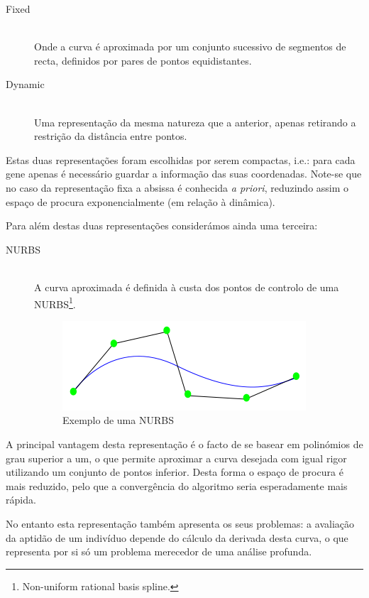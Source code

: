 \documentclass[a4paper]{article}
\begin{document}
\begin{description}
	\item[Fixed] \hfill \\ 
		Onde a curva é aproximada por um conjunto sucessivo de segmentos de recta, definidos por pares de pontos equidistantes.
	\item[Dynamic] \hfill \\ 
		Uma representação da mesma natureza que a anterior, apenas retirando a restrição da distância entre pontos.
\end{description}

\indent Estas duas representações foram escolhidas por serem compactas, i.e.: para cada gene apenas é necessário guardar a informação das suas coordenadas.
Note-se que no caso da representação fixa a absissa é conhecida \emph{a priori}, reduzindo assim o espaço de procura exponencialmente (em relação à dinâmica).

\indent Para além destas duas representações considerámos ainda uma terceira:

\begin{description}
	\item[NURBS] \hfill \\ 
		A curva aproximada é definida à custa dos pontos de controlo de uma NURBS\footnote[2]{Non-uniform rational basis spline.}. 
		\begin{figure}[ht]
			\centering
			\includegraphics[scale=0.50]{images/NURBstatic.png}
			\caption{Exemplo de uma NURBS}
			\label{fig:nurbs}
		\end{figure}
\end{description}

\indent A principal vantagem desta representação é o facto de se basear em polinómios de grau superior a um, o que permite aproximar a curva desejada
com igual rigor utilizando um conjunto de pontos inferior. Desta forma o espaço de procura é mais reduzido, pelo que a convergência do algoritmo
seria esperadamente mais rápida.

\indent No entanto esta representação também apresenta os seus problemas: a avaliação da aptidão de um indivíduo depende do cálculo da derivada
desta curva, o que representa por si só um problema merecedor de uma análise profunda. 
\end{document}
